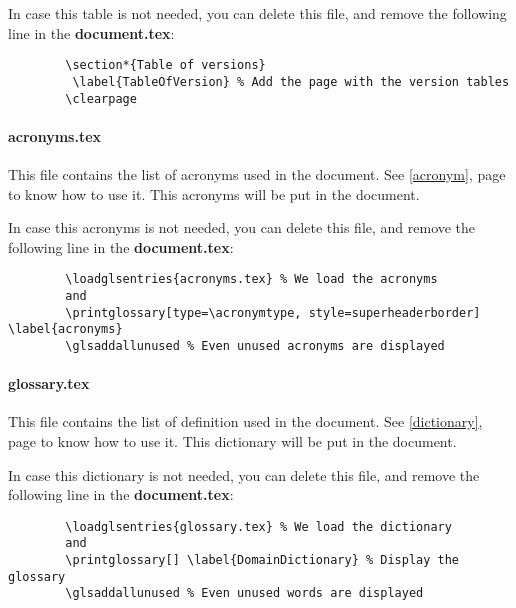 In case this table is not needed, you can delete this file, and remove the following line in the
\textbf{document.tex}:
\begin{code}
    \begin{verbatim}
        \section*{Table of versions}
         \label{TableOfVersion} % Add the page with the version tables
        \clearpage
    \end{verbatim}
    \caption{Delete versions table}
\end{code}

\paragraph{acronyms.tex}
This file contains the list of acronyms used in the document. See \ref{acronym}, page
\pageref{acronym} to know how to use it.
This acronyms will be put in the document.\newline

In case this acronyms is not needed, you can delete this file, and remove the following line in the
\textbf{document.tex}:
\begin{code}
    \begin{verbatim}
        \loadglsentries{acronyms.tex} % We load the acronyms
        and
        \printglossary[type=\acronymtype, style=superheaderborder] \label{acronyms}
        \glsaddallunused % Even unused acronyms are displayed
    \end{verbatim}
    \caption{Delete acronyms}
\end{code}

\paragraph{glossary.tex}
This file contains the list of definition used in the document. See \ref{dictionary}, page
\pageref{dictionary} to know how to use it.
This dictionary will be put in the document.\newline

In case this dictionary is not needed, you can delete this file, and remove the following line in
the \textbf{document.tex}:
\begin{code}
    \begin{verbatim}
        \loadglsentries{glossary.tex} % We load the dictionary
        and
        \printglossary[] \label{DomainDictionary} % Display the glossary
        \glsaddallunused % Even unused words are displayed
    \end{verbatim}
    \caption{Delete dictionary}
\end{code}

